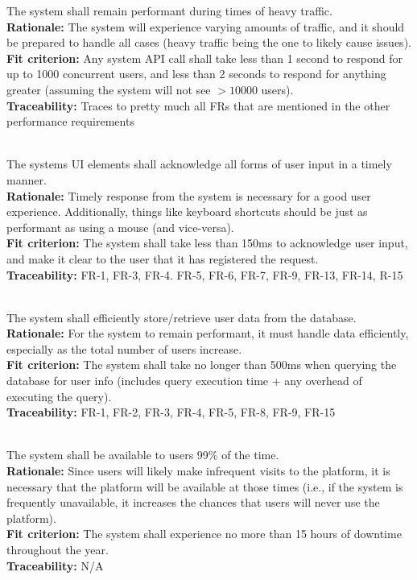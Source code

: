 \documentclass[12pt, titlepage]{article}
\newcounter{NFR_Counter}
\newcounter{FR_Counter}
\begin{document}
The system shall remain performant during times of heavy traffic.\\
\textbf{Rationale:}
The system will experience varying amounts of traffic, and it should be prepared to handle all cases (heavy traffic being the 
one to likely cause issues).\\
\textbf{Fit criterion:}
Any system API call shall take less than 1 second to respond for up to 1000 concurrent users, and less than 2 seconds to respond for anything 
greater (assuming the system will not see $>10000$ users).\\
\textbf{Traceability:}
Traces to pretty much all FRs that are mentioned in the other performance requirements \\~\\
\addtocounter{NFR_Counter}{1}

The systems UI elements shall acknowledge all forms of user input in a timely manner.\\
\textbf{Rationale:}
Timely response from the system is necessary for a good user experience. Additionally, things like keyboard
shortcuts should be just as performant as using a mouse (and vice-versa).\\
\textbf{Fit criterion:}
The system shall take less than 150ms to acknowledge user input, and make it clear to the user that it has registered the request.\\
\textbf{Traceability:}
FR-1, FR-3, FR-4. FR-5, FR-6, FR-7, FR-9, FR-13, FR-14, R-15 \\~\\
\addtocounter{NFR_Counter}{1}

The system shall efficiently store/retrieve user data from the database.\\
\textbf{Rationale:}
For the system to remain performant, it must handle data efficiently, especially as the total number of users increase.\\
\textbf{Fit criterion:}
The system shall take no longer than 500ms when querying the database for user info (includes query execution time + any overhead of executing 
the query).\\
\textbf{Traceability:}
FR-1, FR-2, FR-3, FR-4, FR-5, FR-8, FR-9, FR-15 \\~\\
\addtocounter{NFR_Counter}{1}

The system shall be available to users 99\% of the time.\\
\textbf{Rationale:}
Since users will likely make infrequent visits to the platform, it is necessary that the platform will be available at those 
times (i.e., if the system is frequently unavailable, it increases the chances that users will never use the platform).\\
\textbf{Fit criterion:}
The system shall experience no more than 15 hours of downtime throughout the year.\\
\textbf{Traceability:}
N/A
\addtocounter{NFR_Counter}{1}
\end{document}
